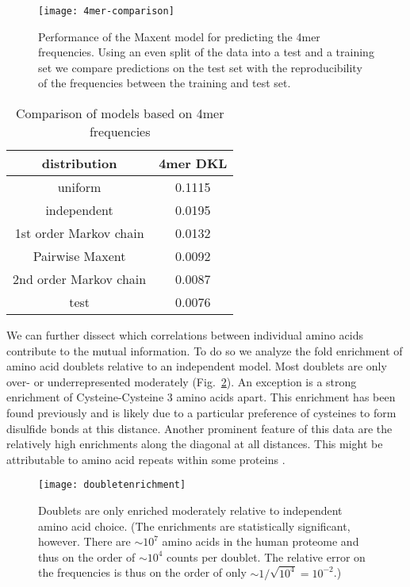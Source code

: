 \documentclass[superscriptaddress,twocolumn,pre]{revtex4}
\newcommand{\<}{\langle}
\renewcommand{\>}{\rangle}
\begin{document}
\begin{figure}
    \texttt{[image: 4mer-comparison]}
    \caption{Performance of the Maxent model for predicting the 4mer frequencies. Using an even split of the data into a test and a training set we compare predictions on the test set with the reproducibility of the frequencies between the training and test set.
    \label{fig4mermaxent}
    }
\end{figure}

\begin{table}
    \begin{center}
        \begin{tabular}{ c c }
            distribution & 4mer DKL\\ \hline
            uniform & 0.1115\\
            independent & 0.0195\\
            1st order Markov chain & 0.0132\\
            Pairwise Maxent & 0.0092\\
            2nd order Markov chain & 0.0087\\
            test & 0.0076\\
        \end{tabular}
    \end{center}
    \caption{Comparison of models based on 4mer frequencies}
\end{table}

We can further dissect which correlations between individual amino acids contribute to the mutual information. To do so we analyze the fold enrichment of amino acid doublets relative to an independent model. Most doublets are only over- or underrepresented moderately (Fig.~\ref{figdoubletentrichment}). An exception is a strong enrichment of Cysteine-Cysteine 3 amino acids apart. This enrichment has been found previously \cite{Greenbaum2014} and is likely due to a particular preference of cysteines to form disulfide bonds at this distance. Another prominent feature of this data are the relatively high enrichments along the diagonal at all distances. This might be attributable to amino acid repeats within some proteins \cite{Turjanski2018}.

\begin{figure}
    \texttt{[image: doubletenrichment]}
    \caption{Doublets are only enriched moderately relative to independent amino acid choice. (The enrichments are statistically significant, however. There are $\sim 10^7$ amino acids in the human proteome and thus on the order of $\sim 10^4$ counts per doublet. The relative error on the frequencies is thus on the order of only $\sim 1/\sqrt{10^4} = 10^{-2}$.)
    \label{figdoubletentrichment}
    }
\end{figure}
\end{document}
